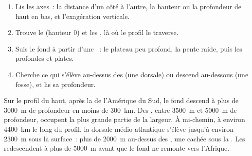 \begin{method}
\begin{enumerate}
  \item Lis les axes~: la distance d'un côté à l'autre, la hauteur ou la
        profondeur de haut en bas, et l'exagération verticale.
  \item Trouve le  (hauteur 0) et les , là où le
        profil le traverse.
  \item Suis le fond à partir d'une ~: le plateau peu profond, la pente
        raide, puis les  profondes et plates.
  \item Cherche ce qui s'élève au-dessus des  (une dorsale) ou
        descend au-dessous (une fosse), et lis sa profondeur.
\end{enumerate}
\end{method}

\begin{example}
Sur le profil du haut, après la  de l'Amérique du Sud, le fond
descend à plus de \qty{3000}{m} de profondeur en moins de \qty{300}{km}. Des ,
entre \qty{3500}{m} et \qty{5000}{m} de profondeur, occupent la plus grande
partie de la largeur. À mi-chemin, à environ \qty{4400}{km} le long du
profil, la dorsale médio-atlantique s'élève jusqu'à environ \qty{2300}{m}
sous la surface~: plus de \qty{2000}{m} au-dessus des , une  cachée sous la . Les  redescendent à plus de
\qty{5000}{m} avant que le fond ne remonte vers l'Afrique.
\end{example}

